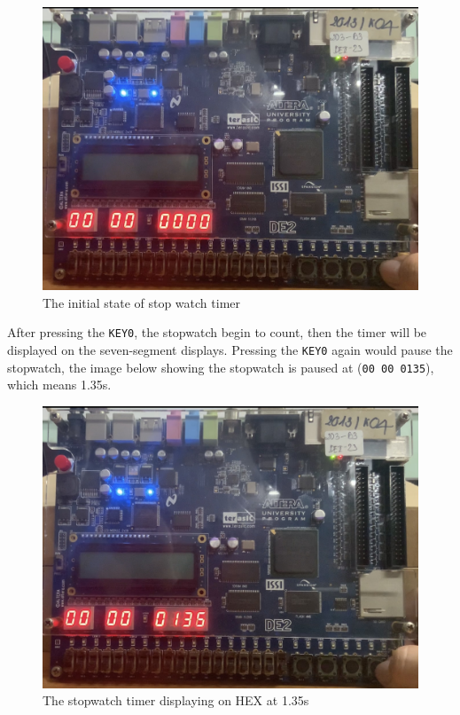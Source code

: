 \documentclass[12pt,a4paper,oneside]{book} %
\begin{document}
 \begin{figure}[H]
    \begin{center}
    \includegraphics[width=.82\textwidth]{images/timer1.jpg}
    \caption{The initial state of stop watch timer}
    \end{center}
\end{figure}

After pressing the \texttt{KEY0}, the stopwatch begin to count, then the timer will be displayed on the seven-segment displays. Pressing the \texttt{KEY0} again would pause the stopwatch, the image below showing the stopwatch is paused at (\texttt{00 00 0135}), which means 1.35s.

 \begin{figure}[H]
    \begin{center}
    \includegraphics[width=.82\textwidth]{images/timer2.jpg}
    \caption{The stopwatch timer displaying on HEX at 1.35s}
    \end{center}
\end{figure}
\end{document}
